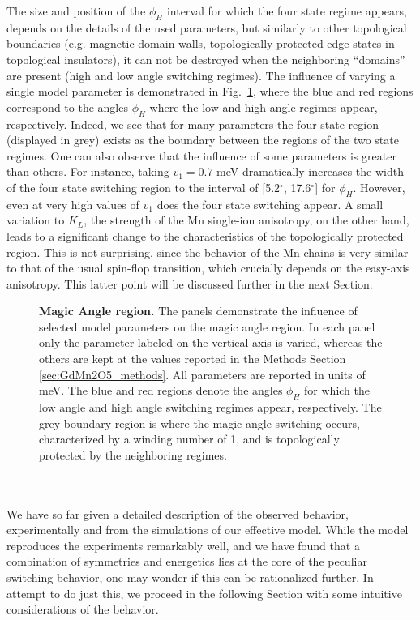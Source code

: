 The size and position of the $\phi_H$ interval for which the four state regime appears, depends on the details of the used parameters, but similarly to other topological boundaries (e.g. magnetic domain walls, topologically protected edge states in topological insulators), it can not be destroyed when the neighboring ``domains'' are present (high and low angle switching regimes).
The influence of varying a single model parameter is demonstrated in Fig.~\ref{fig:GdMn2O5_windingvsparam}, where the blue and red regions correspond to the angles $\phi_H$ where the low and high angle regimes appear, respectively.
Indeed, we see that for many parameters the four state region (displayed in grey) exists as the boundary between the regions of the two state regimes.
One can also observe that the influence of some parameters is greater than others. For instance, taking $v_1=0.7$ meV dramatically increases the width of the four state switching region to the interval of [5.2$^\circ$, 17.6$^\circ$] for $\phi_H$.
However, even at very high values of $v_1$ does the four state switching appear.
A small variation to $K_L$, the strength of the Mn single-ion anisotropy, on the other hand, leads to a significant change to the characteristics of the topologically protected region.
This is not surprising, since the behavior of the Mn chains is very similar to that of the usual spin-flop transition, which crucially depends on the easy-axis anisotropy. This latter point will be discussed further in the next Section.
\begin{figure}
	\caption{\label{fig:GdMn2O5_windingvsparam} {\bf Magic Angle region.} The panels demonstrate the influence of selected model parameters on the magic angle region. In each panel only the parameter labeled on the vertical axis is varied, whereas the others are kept at the values reported in the Methods Section \ref{sec:GdMn2O5_methods}. All parameters are reported in units of meV. The blue and red regions denote the angles $\phi_H$ for which the low angle and high angle switching regimes appear, respectively. The grey boundary region is where the magic angle switching occurs, characterized by a winding number of 1, and is topologically protected by the neighboring regimes.}
\end{figure}
\\\\
We have so far given a detailed description of the observed behavior, experimentally and from the simulations of our effective model.
While the model reproduces the experiments remarkably well, and we have found that a combination of symmetries and energetics lies at the core of the peculiar switching behavior, one may wonder if this can be rationalized further.
In attempt to do just this, we proceed in the following Section with some intuitive considerations of the behavior.

